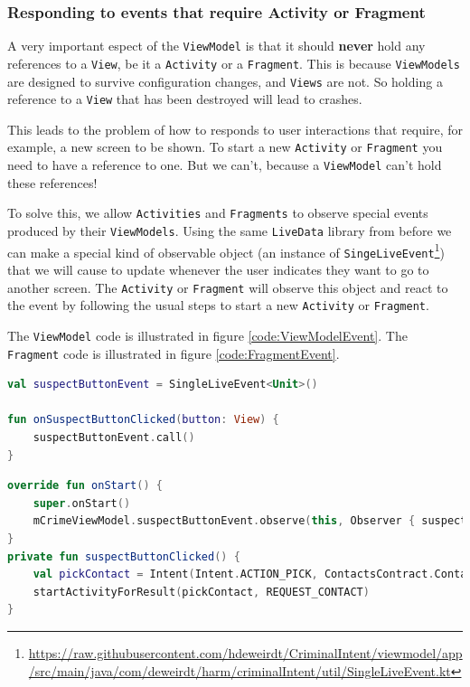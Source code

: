 \subsubsection{Responding to events that require Activity or Fragment}
A very important espect of the \lstinline!ViewModel! is that it should \textbf{never} hold any references to a \lstinline!View!, be it a \lstinline!Activity! or a \lstinline!Fragment!.
This is because \lstinline!ViewModels! are designed to survive configuration changes, and \lstinline!Views! are not.
So holding a reference to a \lstinline!View! that has been destroyed will lead to crashes. 

This leads to the problem of how to responds to user interactions that require, for example, a new screen to be shown.
To start a new \lstinline!Activity! or \lstinline!Fragment! you need to have a reference to one.
But we can't, because a \lstinline!ViewModel! can't hold these references!

To solve this, we allow \lstinline!Activities! and \lstinline!Fragments! to observe special events produced by their \lstinline!ViewModels!.
Using the same \lstinline!LiveData! library from before we can make a special kind of observable object 
(an instance of \lstinline!SingeLiveEvent!\footnote{\url{https://raw.githubusercontent.com/hdeweirdt/CriminalIntent/viewmodel/app/src/main/java/com/deweirdt/harm/criminalIntent/util/SingleLiveEvent.kt}}) 
that we will cause to update whenever the user indicates they want to go to another screen.
The \lstinline!Activity! or \lstinline!Fragment! will observe this object and react to the event by following the usual steps to start a new \lstinline!Activity! or \lstinline!Fragment!.

The \lstinline!ViewModel! code is illustrated in figure \ref{code:ViewModelEvent}.
The \lstinline!Fragment! code is illustrated in figure \ref{code:FragmentEvent}.
	
\begin{lstlisting}[language=Kotlin, label=code:ViewModelEvent,
caption={The \lstinline!ViewModel! has one \lstinline!SingeLiveEvent! for each interaction that eventually requires action from a \lstinline!Activity! or \lstinline!Fragment!.
The \lstinline!onButtonClicked! functions are referenced in the layout files.}]
val suspectButtonEvent = SingleLiveEvent<Unit>()

fun onSuspectButtonClicked(button: View) {
	suspectButtonEvent.call()
}
\end{lstlisting}

\begin{lstlisting}[language=Kotlin,label=code:FragmentEvent,
caption={The \lstinline!Activities! or \lstinline!Fragments! observe the events from the  \lstinline!ViewModel!, and respond by creating a new \lstinline!Activity! or \lstinline!Fragment!}]
 override fun onStart() {
	super.onStart()
	mCrimeViewModel.suspectButtonEvent.observe(this, Observer { suspectButtonClicked() })
}
private fun suspectButtonClicked() {
	val pickContact = Intent(Intent.ACTION_PICK, ContactsContract.Contacts.CONTENT_URI)
	startActivityForResult(pickContact, REQUEST_CONTACT)
}
\end{lstlisting}